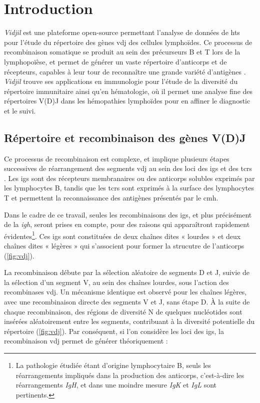 \chapter{Introduction}

\textit{Vidjil} est une plateforme open-source
\cite{giraudFastMulticlonalClusterization2014b} permettant l'analyse de données
de \gls{hts} pour l'étude du répertoire des gènes \gls{vdj} des cellules
lymphoïdes. Ce processus de recombinaison somatique se produit au sein des
précurseurs B et T lors de la lymphopoïèse, et permet de générer un vaste
répertoire d'anticorps et de récepteurs, capables à leur tour de reconnaître une
grande variété d'antigènes \cite{jonesTamingTransposonVDJ2004}. \textit{Vidjil}
trouve ses applications en immunologie pour l'étude de la diversité du
répertoire immunitaire ainsi qu'en hématologie, où il permet une analyse fine
des répertoires V(D)J dans les hémopathies lymphoïdes pour en affiner le
diagnostic et le suivi.

\section{Répertoire et recombinaison des gènes V(D)J}

Ce processus de recombinaison est complexe, et implique plusieurs étapes
successives de réarrangement des segments \gls{vdj} au sein des loci des
\glspl{ig} et des \glspl{tcr} \cite{rothVDJRecombinationMechanism2014}. Les
\glspl{ig} sont des récepteurs membranaires ou des anticorps solubles exprimés
par les lymphocytes B, tandis que les \glspl{tcr} sont exprimés à la surface
des lymphocytes T et permettent la reconnaissance des antigènes présentés par
le \gls{cmh}.

Dans le cadre de ce travail, seules les recombinaisons des \glspl{ig}, et plus
précisément de la \textit{\gls{igh}}, seront prises en compte,
pour des raisons qui apparaîtront rapidement évidentes\footnote{La pathologie
étudiée étant d'origine lymphocytaire B, seuls les réarrangements impliqués
dans la production des anticorps, c'est-à-dire les réarrangements \textit{IgH},
et dans une moindre mesure \textit{IgK} et \textit{IgL} sont pertinents.}. 
Ces \glspl{ig} sont constituées de deux chaînes dites « lourdes » et deux chaînes
 dites « légères » qui s'associent pour former la strucutre de l'anticorps (\autoref{fig:vdj}).

La recombinaison débute par la sélection aléatoire de segments D et J, suivie
de la sélection d'un segment V, au sein des chaînes lourdes, sous
l'action des recombinases \gls{vdj}. Un mécanisme identique est observé pour
les chaînes légères, avec une recombinaison directe des segments V et J,
sans étape D. À la suite de chaque recombinaison, des régions de diversité N de
quelques nucléotides sont insérées aléatoirement entre les segments,
contribuant à la diversité potentielle du répertoire (\autoref{fig:vdj}). Par
conséquent, si l'on considère les loci des \glspl{ig}, la recombinaison
\gls{vdj} permet de générer théoriquement :

